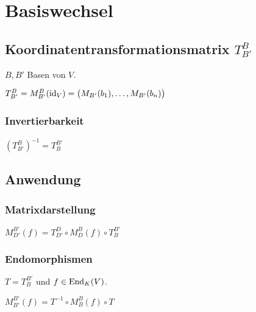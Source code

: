 \section*{Basiswechsel}

\subsection*{Koordinatentransformationsmatrix $T_{B'}^B$}
$B,B'$ Basen von $V$.

$T_{B'}^B=M_{B'}^B(\operatorname{id}_V)=\big(M_{B'}(b_1),\dots,M_{B'}(b_n)\big)$

\subsubsection*{Invertierbarkeit}
$\left(T_{B'}^B\right)^{-1} = T_B^{B'}$

\subsection*{Anwendung}

\subsubsection*{Matrixdarstellung}
$M_{D'}^{B'}(f) = T_{D'}^D \circ M_D^B(f) \circ T_B^{B'}$

\subsubsection*{Endomorphismen}
$T = T_B^{B'}$ und $f \in\operatorname{End}_K(V)$.

$M_{B'}^{B'}(f) = T^{-1} \circ M_B^B(f) \circ T$
